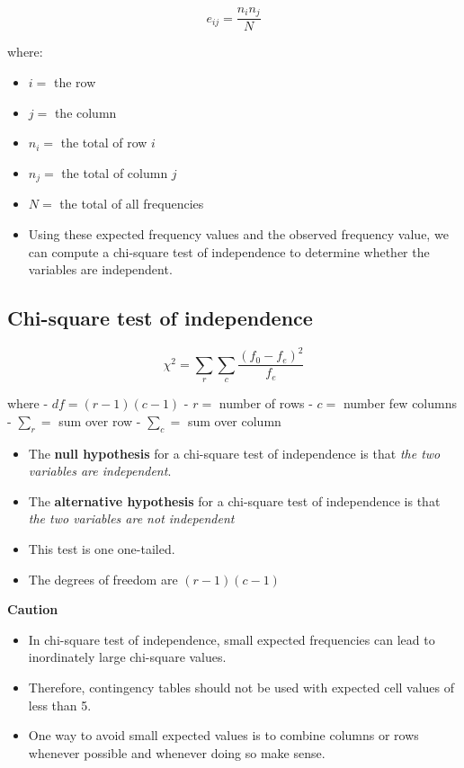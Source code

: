 \documentclass[]{book}
\providecommand{\tightlist}{%
  \setlength{\itemsep}{0pt}\setlength{\parskip}{0pt}}
\begin{document}
\[e_{ij} = \frac{n_in_j}{N}\]

where:

\begin{itemize}
\tightlist
\item
  \(i =\) the row
\item
  \(j =\) the column
\item
  \(n_i =\) the total of row \(i\)
\item
  \(n_j =\) the total of column \(j\)
\item
  \(N =\) the total of all frequencies
\end{itemize}

\begin{itemize}
\tightlist
\item
  Using these expected frequency values and the observed frequency value, we can compute a chi-square test of independence to determine whether the variables are independent.
\end{itemize}

\hypertarget{chi-square-test-of-independence}{%
\subsection{Chi-square test of independence}\label{chi-square-test-of-independence}}

\[\chi^2 =\sum_r\sum_c \frac{(f_0-f_e)^2}{f_e}\]

where
- \(df = (r-1)(c-1)\)
- \(r=\) number of rows
- \(c=\) number few columns
- \(\sum_r=\) sum over row
- \(\sum_c=\) sum over column

\begin{itemize}
\item
  The \textbf{null hypothesis} for a chi-square test of independence is that \emph{the two variables are independent}.
\item
  The \textbf{alternative hypothesis} for a chi-square test of independence is that \emph{the two variables are not independent}
\item
  This test is one one-tailed. 
\end{itemize}

\begin{itemize}
\tightlist
\item
  The degrees of freedom are \((r-1)(c-1)\)
\end{itemize}

\textbf{Caution}

\begin{itemize}
\item
  In chi-square test of independence, small expected frequencies can lead to inordinately large chi-square values.
\item
  Therefore, contingency tables should not be used with expected cell values of less than 5.
\item
  One way to avoid small expected values is to combine columns or rows whenever possible and whenever doing so make sense.
\end{itemize}
\end{document}
